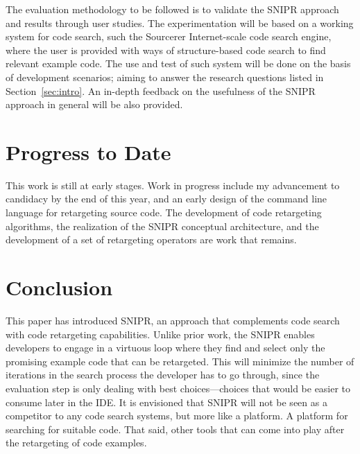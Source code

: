 \documentclass[conference]{IEEEtran}
\begin{document}
The evaluation methodology to be followed is to validate the \uppercase{SnipR} approach and results through user studies.  The experimentation will be based on a working system for code search, such the Sourcerer\cite{Bajracharya:2006vn} Internet-scale code search engine, where the user is provided with ways of structure-based code search to find relevant example code. The use and test of such system will be done on the basis of development scenarios; aiming to answer the research questions listed in Section~\ref{sec:intro}. An in-depth feedback on the usefulness of the \uppercase{SnipR} approach in general will be also provided. 

\section{Progress to Date}
\label{sec:progress}
This work is still at early stages. Work in progress include my advancement to candidacy by the end of this year, and an early design of the command line language for retargeting source code. The development of code retargeting algorithms, the realization of the \uppercase{SnipR} conceptual architecture, and the development of a set of retargeting operators are work that remains.

\section{Conclusion}
\label{sec:conclude}
This paper has introduced \uppercase{SnipR}, an approach that complements code search with code retargeting capabilities. Unlike prior work, the \uppercase{SnipR} enables developers to engage in a virtuous loop where they find and select only the promising example code that can be retargeted. This will minimize the number of iterations in the search process the developer has to go through, since the evaluation step is only dealing with best choices---choices that would be easier to consume later in the IDE. It is envisioned that \uppercase{SnipR} will not be seen as a competitor to any code search systems, but more like a platform. A platform for searching for suitable code. That said, other tools that can come into play after the retargeting of code examples.




%
	
\end{document}
